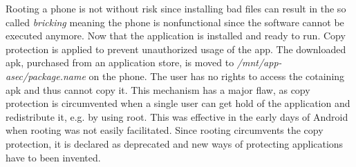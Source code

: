 Rooting a phone is not without risk since installing bad files can result in the so called \textit{bricking} meaning the phone is nonfunctional since the software cannot be executed anymore. \cite{androidpoliceRoot}
\newline
Now that the application is installed and ready to run.
Copy protection is applied to prevent unauthorized usage of the app.
The downloaded \gls{apk}, purchased from an application store, is moved to \textit{/mnt/app-asec/package.name} on the phone.
The user has no rights to access the cotaining \gls{apk} and thus cannot copy it.
This mechanism has a major flaw, as copy protection is circumvented when a single user can get hold of the application and redistribute it, e.g. by using root.
This was effective in the early days of Android when rooting was not easily facilitated.
\newline
Since rooting circumvents the copy protection, it is declared as deprecated and new ways of protecting applications have to been invented.
